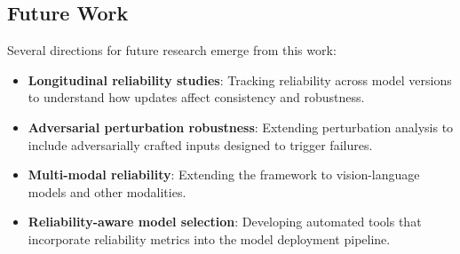 \subsection{Future Work}

Several directions for future research emerge from this work:

\begin{itemize}
    \item \textbf{Longitudinal reliability studies}: Tracking reliability across model versions to understand how updates affect consistency and robustness.

    \item \textbf{Adversarial perturbation robustness}: Extending perturbation analysis to include adversarially crafted inputs designed to trigger failures.

    \item \textbf{Multi-modal reliability}: Extending the framework to vision-language models and other modalities.

    \item \textbf{Reliability-aware model selection}: Developing automated tools that incorporate reliability metrics into the model deployment pipeline.
\end{itemize}
